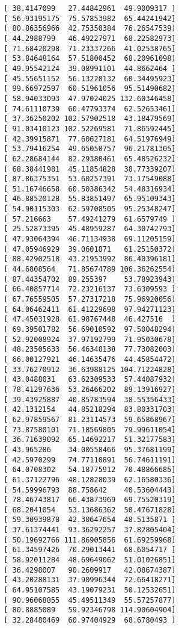 \documentclass{article}
\begin{document}
\begin{lstlisting}
 [ 38.4147099   27.44842961  49.9009317 ]
 [ 56.93195175  75.57853982  65.44241942]
 [ 80.86356966  42.75350384  76.26547539]
 [ 44.2988799   46.49227971  68.22582973]
 [ 71.68420298  71.23337266  41.02538765]
 [ 53.84648164  57.51800452  68.20961098]
 [ 49.95542124  39.08991101  44.8662464 ]
 [ 45.55651152  56.13220132  60.34495923]
 [ 99.66972597  60.51961056  95.51490682]
 [ 58.94033093  47.97024025 132.60346458]
 [ 74.61110739  60.47793374  62.52653461]
 [ 37.36250202 102.57902518  43.18479569]
 [ 91.03410123 102.52269581  71.86592445]
 [ 42.39915871  77.60627181  64.51976949]
 [ 53.79416254  49.65050757  96.21781305]
 [ 62.28684144  82.29380461  65.48526232]
 [ 68.38441981  45.11854828  38.77339207]
 [ 87.86375351  53.60257391  73.17549088]
 [ 51.16746658  60.50386342  54.48316934]
 [ 46.88520128  55.83851497  65.95109343]
 [ 54.90115303  62.59708505  95.25348247]
 [ 57.216663    57.49241279  61.6579749 ]
 [ 25.52873395  45.48959287  64.30742793]
 [ 47.93064394  46.71134938  69.11205159]
 [ 47.05946929  39.0601871   61.25150372]
 [ 88.42902518  43.21953992  86.40396181]
 [ 44.6808564   71.85674789 106.36262554]
 [ 87.44354702  89.255397    53.78923943]
 [ 66.40857714  72.23216137  73.6309593 ]
 [ 67.76559505  57.27317218  75.96920056]
 [ 64.06462411  61.41229698  97.94271123]
 [ 47.45031928  61.98767448  46.427516  ]
 [ 69.39501782  56.69010592  97.50048294]
 [ 52.92008924  37.97192799  71.95030678]
 [ 48.23505633  56.46348138  77.73082003]
 [ 66.00127921  46.14635476  44.45854472]
 [ 33.76270912  36.63988125 104.71224828]
 [ 43.0488031   63.62309533  57.44087932]
 [ 78.41297636  53.26466202  89.13916927]
 [ 39.43925887  40.85783594  38.55356433]
 [ 42.1312154   44.85218294  83.80331703]
 [ 62.97859567  81.23114573  59.65868967]
 [ 73.87580101  71.18569805  79.99611054]
 [ 36.71639092  65.14692217  51.32177583]
 [ 43.965286    34.00558466  95.37681199]
 [ 42.5970299   74.77110891  56.74611191]
 [ 64.0708302   54.18775912  70.48866685]
 [ 61.37122796  48.12828039  62.16580336]
 [ 54.59996793  88.758642    40.53604443]
 [ 78.46743817  66.43873969  69.75520319]
 [ 68.2041054   53.13686362  50.47671828]
 [ 59.30939878  42.30647654  48.5135871 ]
 [ 37.61374441  93.36292257  37.82805404]
 [ 50.19692766 111.86905856  61.69259968]
 [ 61.34597426  70.29013441  68.6054717 ]
 [ 58.92011284  48.69649062  51.01026851]
 [ 36.4298007   90.2609917   42.08674387]
 [ 43.20288131  37.90996344  72.66418271]
 [ 64.95107585  43.19079231  50.12532651]
 [ 90.96068855  45.49511349  55.57257877]
 [ 80.8885089   59.92346798 114.90604904]
 [ 32.28480469  60.97404929  68.6780493 ]

\end{lstlisting}
\end{document}
